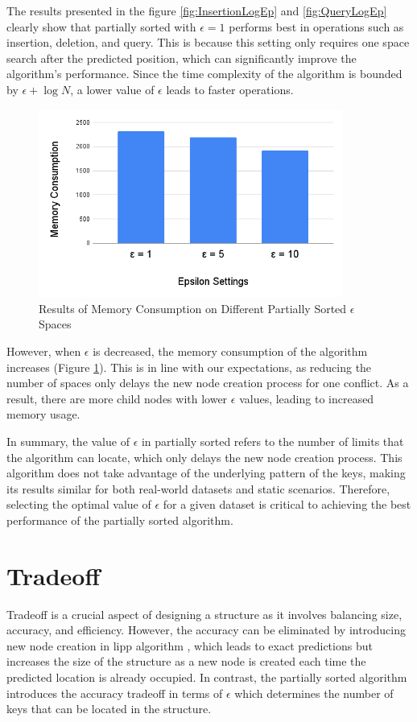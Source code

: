 The results presented in the figure \ref{fig:InsertionLogEp} and \ref{fig:QueryLogEp} clearly show that partially sorted with $\epsilon = 1$ performs best in operations such as insertion, deletion, and query. This is because this setting only requires one space search after the predicted position, which can significantly improve the algorithm's performance. Since the time complexity of the algorithm is bounded by $\epsilon+\log N$, a lower value of $\epsilon$ leads to faster operations.
\begin{figure}[H]
    \centering
    \includegraphics[width=100mm,scale=1]{Figures/MemoryLogEp.png}
    \caption{
     Results of Memory Consumption on Different Partially Sorted $\epsilon$ Spaces 
    }
    \label{fig:MemoryLogEp}
\end{figure}
However, when $\epsilon$ is decreased, the memory consumption of the algorithm increases (Figure \ref{fig:MemoryLogEp}). This is in line with our expectations, as reducing the number of spaces only delays the new node creation process for one conflict. As a result, there are more child nodes with lower $\epsilon$ values, leading to increased memory usage.

In summary, the value of $\epsilon$ in partially sorted refers to the number of limits that the algorithm can locate, which only delays the new node creation process. This algorithm does not take advantage of the underlying pattern of the keys, making its results similar for both real-world datasets and static scenarios. Therefore, selecting the optimal value of $\epsilon$ for a given dataset is critical to achieving the best performance of the partially sorted algorithm.

\section{Tradeoff}
Tradeoff is a crucial aspect of designing a \learnindex structure as it involves balancing size, accuracy, and efficiency. However, the accuracy can be eliminated by introducing new node creation in \acrshort{lipp} algorithm \cite{LIPP}, which leads to exact predictions but increases the size of the structure as a new node is created each time the predicted location is already occupied. In contrast, the partially sorted algorithm introduces the accuracy tradeoff in terms of $\epsilon$ which determines the number of keys that can be located in the structure.

